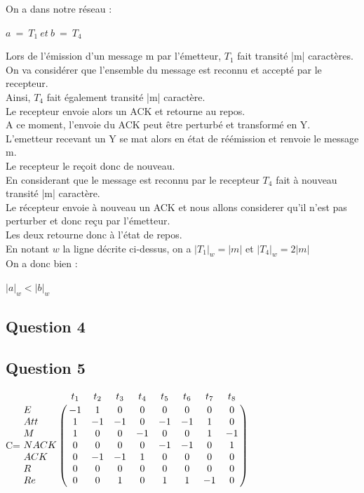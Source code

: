 On a dans notre réseau :
\begin{center}
  $a\ =\ T_1\ et\ b\ =\ T_4$
\end{center}

Lors de l'émission d'un message m par l'émetteur, $T_1$ fait transité |m| caractères.\\
On va considérer que l'ensemble du message est reconnu et accepté par le recepteur.\\
Ainsi, $T_4$ fait également transité |m| caractère.\\
Le recepteur envoie alors un ACK et retourne au repos.\\
A ce moment, l'envoie du ACK peut être perturbé et transformé en Y. L'emetteur recevant un Y se mat alors en état de réémission et renvoie le message m.\\
Le recepteur le reçoit donc de nouveau.\\
En considerant que le message est reconnu par le recepteur $T_4$ fait à nouveau transité |m| caractère.\\
Le récepteur envoie à nouveau un ACK et nous allons considerer qu'il n'est pas perturber et donc reçu par l'émetteur.\\
Les deux retourne donc à l'état de repos.\\

En notant $w$ la ligne décrite ci-dessus, on a $|T_1|_w = |m|$ et $|T_4|_w = 2|m|$\\
On a donc bien :
\begin{center}
  $|a|_w < |b|_w$
\end{center}

\subsection{Question 4}


\subsection{Question 5}

\vspace{1cm}

\begin{center}

{\Huge C}\qquad =\qquad $\bordermatrix{
    &t_1 &t_2 &t_3 &t_4 &t_5 &t_6 &t_7 &t_8\cr
E   & -1& 1 & 0 & 0 & 0 & 0 & 0 & 0\cr
Att & 1 &-1 &-1 & 0 &-1 &-1 & 1 & 0\cr
M   & 1 & 0 & 0 &-1 & 0 & 0 & 1 &-1\cr
NACK& 0 & 0 & 0 & 0 &-1 &-1 & 0 & 1\cr
ACK & 0 &-1 &-1 & 1 & 0 & 0 & 0 & 0\cr
R   & 0 & 0 & 0 & 0 & 0 & 0 & 0 & 0\cr
Re  & 0 & 0 & 1 & 0 & 1 & 1 &-1 & 0\cr
}$

\end{center}

